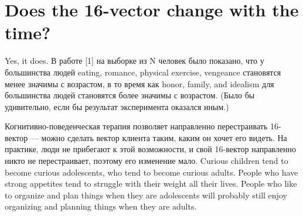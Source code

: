 \documentclass[11pt]{article}
\theoremstyle{remark}
\theoremstyle{definition}
\begin{document}





\section{Does the 16-vector change with the time?}

Yes, it does. В работе [1] на выборке из N человек было показано, что у большинства людей eating, romance, physical exercise, vengeance становятся менее значимы с возрастом, в то время как honor, family, and idealism для большинства людей становятся более значимы с возрастом. (Было бы удивительно, если бы результат эксперимента оказался иным.) 

Когнитивно-поведенческая терапия позволяет направленно перестраивать 16-вектор --- можно сделать вектор клиента таким, каким он хочет его видеть. На практике, люди не прибегают к этой возможности, и свой 16-вектор направленно никто не перестраивает, поэтому его изменение мало. Curious children tend to become curious adolescents, who tend to become curious adults. People who have strong appetites tend to struggle with their weight all their lives. People who like to organize and plan things when they are adolescents will probably still enjoy organizing and planning things when they are adults.


\end{document}
